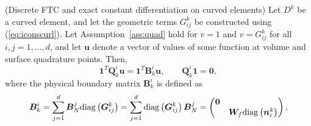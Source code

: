\documentclass[review]{siamart0216}
\theoremstyle{assumption}
\newcommand{\LRp}[1]{\left( #1 \right)}
\newcommand{\diag}[1]{{\rm diag}\LRp{#1}}
\begin{document}
\begin{lemma}{(Discrete FTC and exact constant differentiation on curved elements)}
\label{lemma:vdsbpcurved} 
Let $D^k$ be a curved element, and let the geometric terms $G^k_{ij}$ be constructed using (\ref{eq:iconscurl}).  Let Assumption~\ref{ass:quad} hold for $v = 1$ and $v = G^k_{ij}$ for all $i,j = 1,\ldots, d$, and let $\bm{u}$ denote a vector of values of some function at volume and surface quadrature points.  Then, 
\[
\bm{1}^T\bm{Q}^i_k\bm{u} = \bm{1}^T\bm{B}^i_k\bm{u}, \qquad \bm{Q}^i_k\bm{1} = \bm{0},
\]
where the physical boundary matrix $\bm{B}^i_k$ is defined as
\[
\bm{B}^i_k = \sum_{j=1}^d \bm{B}^j_N \diag{\bm{G}^k_{ij}} = \sum_{j=1}^d \diag{\bm{G}^k_{ij}}\bm{B}^j_N  = \begin{pmatrix}
\bm{0}&\\
& \bm{W}_f \diag{\bm{n}^k_i}\end{pmatrix}.
\]
\end{lemma}
\end{document}
